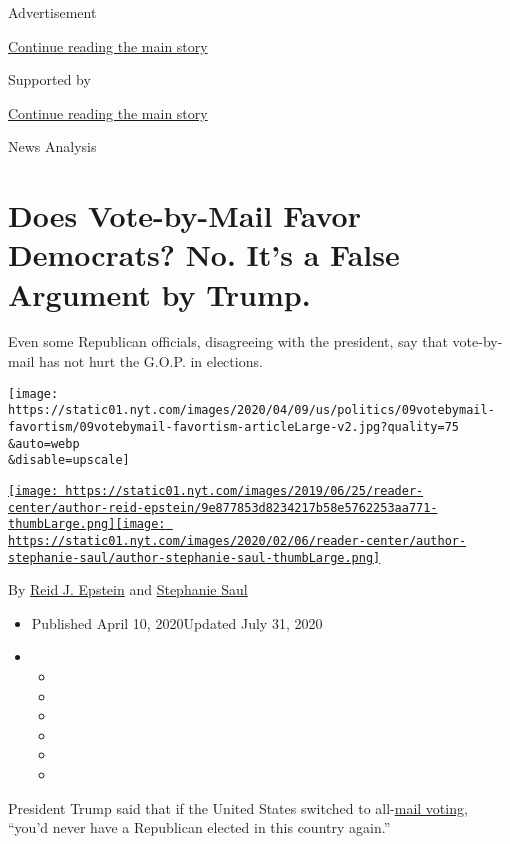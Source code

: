 Advertisement

\protect\hyperlink{after-top}{Continue reading the main story}

Supported by

\protect\hyperlink{after-sponsor}{Continue reading the main story}

News Analysis

\hypertarget{does-vote-by-mail-favor-democrats-no-its-a-false-argument-by-trump}{%
\section{Does Vote-by-Mail Favor Democrats? No. It's a False Argument by
Trump.}\label{does-vote-by-mail-favor-democrats-no-its-a-false-argument-by-trump}}

Even some Republican officials, disagreeing with the president, say that
vote-by-mail has not hurt the G.O.P. in elections.

\texttt{[image: https://static01.nyt.com/images/2020/04/09/us/politics/09votebymail-favortism/09votebymail-favortism-articleLarge-v2.jpg?quality=75\\\&auto=webp\\\&disable=upscale]}

\href{https://www.nytimes.com/by/reid-j-epstein}{\texttt{[image: https://static01.nyt.com/images/2019/06/25/reader-center/author-reid-epstein/9e877853d8234217b58e5762253aa771-thumbLarge.png]}}\href{https://www.nytimes.com/by/stephanie-saul}{\texttt{[image: https://static01.nyt.com/images/2020/02/06/reader-center/author-stephanie-saul/author-stephanie-saul-thumbLarge.png]}}

By \href{https://www.nytimes.com/by/reid-j-epstein}{Reid J. Epstein} and
\href{https://www.nytimes.com/by/stephanie-saul}{Stephanie Saul}

\begin{itemize}
\item
  Published April 10, 2020Updated July 31, 2020
\item
  \begin{itemize}
  \item
  \item
  \item
  \item
  \item
  \item
  \end{itemize}
\end{itemize}

President Trump said that if the United States switched to
all-\href{https://www.nytimes.com/2020/07/31/us/politics/trump-mail-voting-fraud.html}{mail
voting}, ``you'd never have a Republican elected in this country
again.''

